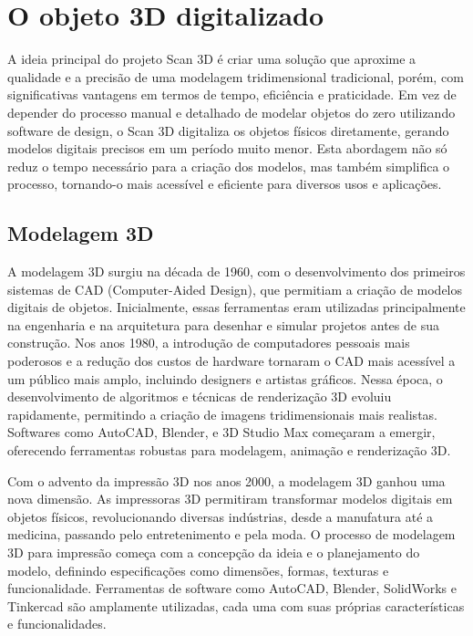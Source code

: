 \chapter{O objeto 3D digitalizado}\label{cap:ojogo}

A ideia principal do projeto Scan 3D é criar uma solução que aproxime a qualidade e a precisão de uma modelagem tridimensional tradicional, porém, com significativas vantagens em termos de tempo, eficiência e praticidade. Em vez de depender do processo manual e detalhado de modelar objetos do zero utilizando software de design, o Scan 3D digitaliza os objetos físicos diretamente, gerando modelos digitais precisos em um período muito menor. Esta abordagem não só reduz o tempo necessário para a criação dos modelos, mas também simplifica o processo, tornando-o mais acessível e eficiente para diversos usos e aplicações.

\section{Modelagem 3D}

A modelagem 3D surgiu na década de 1960, com o desenvolvimento dos primeiros sistemas de CAD (Computer-Aided Design), que permitiam a criação de modelos digitais de objetos. Inicialmente, essas ferramentas eram utilizadas principalmente na engenharia e na arquitetura para desenhar e simular projetos antes de sua construção. Nos anos 1980, a introdução de computadores pessoais mais poderosos e a redução dos custos de hardware tornaram o CAD mais acessível a um público mais amplo, incluindo designers e artistas gráficos. Nessa época, o desenvolvimento de algoritmos e técnicas de renderização 3D evoluiu rapidamente, permitindo a criação de imagens tridimensionais mais realistas. Softwares como AutoCAD, Blender, e 3D Studio Max começaram a emergir, oferecendo ferramentas robustas para modelagem, animação e renderização 3D.

Com o advento da impressão 3D nos anos 2000, a modelagem 3D ganhou uma nova dimensão. As impressoras 3D permitiram transformar modelos digitais em objetos físicos, revolucionando diversas indústrias, desde a manufatura até a medicina, passando pelo entretenimento e pela moda. O processo de modelagem 3D para impressão começa com a concepção da ideia e o planejamento do modelo, definindo especificações como dimensões, formas, texturas e funcionalidade. Ferramentas de software como AutoCAD, Blender, SolidWorks e Tinkercad são amplamente utilizadas, cada uma com suas próprias características e funcionalidades.

